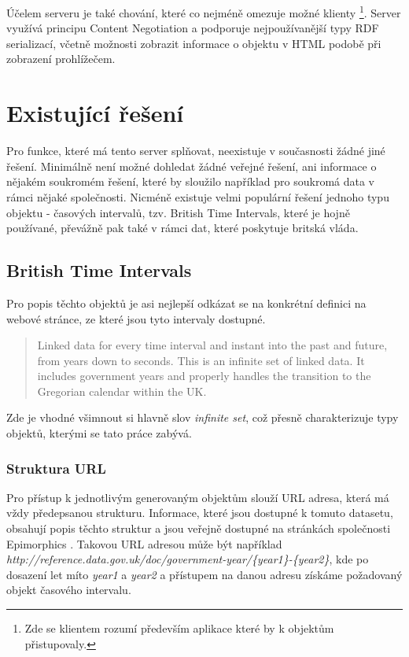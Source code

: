 \documentclass[thesis=B,czech]{FITthesis}[2012/06/26]
\begin{document}
Účelem serveru je také chování, které co nejméně omezuje možné klienty \footnote{Zde se klientem rozumí především aplikace které by k objektům přistupovaly.}.
Server využívá principu Content Negotiation \cite{content_negotiation} a podporuje nejpoužívanější typy RDF serializací, včetně možnosti zobrazit informace 
o objektu v HTML podobě při zobrazení prohlížečem.


\section{Existující řešení}
Pro funkce, které má tento server splňovat, neexistuje v současnosti žádné jiné řešení. Minimálně není možné dohledat 
  žádné veřejné řešení, ani informace o nějakém soukromém řešení, které by sloužilo například pro soukromá data v rámci nějaké společnosti. 
  Nicméně existuje velmi populární řešení jednoho typu objektu - časových intervalů, tzv. British Time Intervals, které je hojně používané,
  převážně pak také v rámci dat, které poskytuje britská vláda.
  
\subsection{British Time Intervals}
Pro popis těchto objektů je asi nejlepší odkázat se na konkrétní definici na webové stránce, ze které jsou tyto intervaly dostupné.\cite{british_ti}
\begin{quote}
 Linked data for every time interval and instant into the past and future, from years down to seconds.
 This is an infinite set of linked data. It includes government years and properly handles the transition to the Gregorian calendar within the UK.
\end{quote}
 Zde je vhodné všimnout si hlavně slov \textit{infinite set}, což přesně charakterizuje typy objektů, kterými se tato práce zabývá.

 \subsubsection{Struktura URL} Pro přístup k jednotlivým generovaným objektům slouží URL adresa, která má vždy předepsanou strukturu. Informace, které jsou dostupné
k tomuto datasetu, obsahují popis těchto struktur a jsou veřejně dostupné na stránkách společnosti Epimorphics \cite{ti_structure}. Takovou URL adresou může být například 
\textit{http://reference.data.gov.uk/doc/government-year/\{year1\}-\{year2\}}, kde po dosazení let míto \textit{year1} a \textit{year2} a přístupem na danou adresu získáme požadovaný 
objekt časového intervalu.
\end{document}
